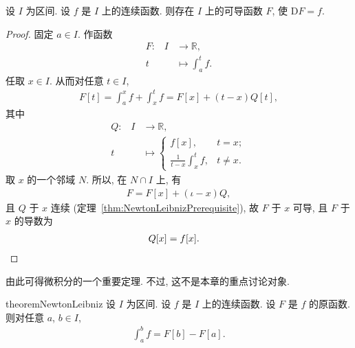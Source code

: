 \begin{theorem}
    设 $I$ 为区间.
    设 $f$ 是 $I$ 上的连续函数.
    则存在 $I$ 上的可导函数 $F$, 使 $\mathrm{D}F = f$.
\end{theorem}

\begin{proof}
    固定 $a \in I$.
    作函数
    \begin{align*}
        \text{$F$:} \quad
        I & \to \mathbb{R},           \\
        t & \mapsto \int_{a}^{t} {f}.
    \end{align*}
    任取 $x \in I$.
    从而对任意 $t \in I$,
    \begin{align*}
        F[t] = \int_{a}^{x} {f} + \int_{x}^{t} {f} = F[x] + (t - x) Q [t],
    \end{align*}
    其中
    \begin{align*}
        \text{$Q$:} \quad
        I & \to \mathbb{R},                                                       \\
        t & \mapsto \begin{cases}
                        f[x],                                             & t = x;    \\
                        {\displaystyle \frac{1}{t - x} \int_{x}^{t} {f}}, & t \neq x.
                    \end{cases}
    \end{align*}
    取 $x$ 的一个邻域 $N$.
    所以, 在 $N \cap I$ 上, 有
    \begin{align*}
        F = F[x] + (\iota - x) Q,
    \end{align*}
    且 $Q$ 于 $x$ 连续
    (定理~\ref{thm:NewtonLeibnizPrerequisite}),
    故 $F$ 于 $x$ 可导, 且 $F$ 于 $x$ 的导数为
    \begin{align*}
         & Q [x] = f[x]. \qedhere
    \end{align*}
\end{proof}

由此可得微积分的一个重要定理.
不过, 这不是本章的重点讨论对象.


\begin{restatable}{theorem}{NewtonLeibniz}%
    \label{thm:NewtonLeibniz}%
    设 $I$ 为区间.
    设 $f$ 是 $I$ 上的连续函数.
    设 $F$ 是 $f$ 的原函数.
    则对任意 $a$, $b \in I$,
    \begin{align*}
        \int_{a}^{b} {f} = F[b] - F[a].
    \end{align*}
\end{restatable}

